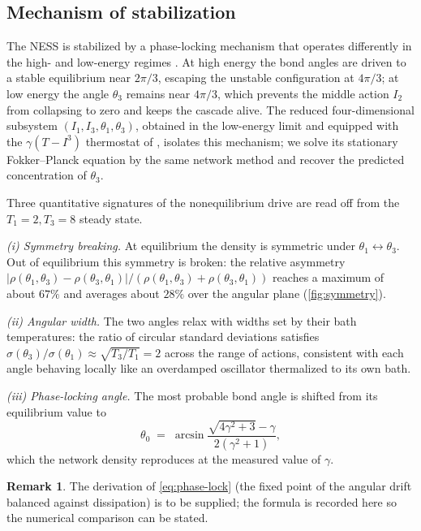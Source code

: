\documentclass[11pt,a4paper]{article}
\theoremstyle{definition}
\newtheorem{remark}[theorem]{Remark}
\numberwithin{equation}{section}   %
\begin{document}
\subsection{Mechanism of stabilization}\label{sec:stabilization}

The NESS is stabilized by a phase-locking mechanism that operates differently in
the high- and low-energy regimes \cite{HLNS}. At high energy the bond angles are
driven to a stable equilibrium near $2\pi/3$, escaping the unstable
configuration at $4\pi/3$; at low energy the angle $\theta_3$ remains near
$4\pi/3$, which prevents the middle action $I_2$ from collapsing to zero and
keeps the cascade alive. The reduced four-dimensional subsystem
$(I_1,I_3,\theta_1,\theta_3)$, obtained in the low-energy limit and equipped
with the $\gamma(T-I^3)$ thermostat of \cite{HLNS}, isolates this mechanism; we
solve its stationary Fokker--Planck equation by the same network method and
recover the predicted concentration of $\theta_3$.

Three quantitative signatures of the nonequilibrium drive are read off from the
$T_1=2,T_3=8$ steady state.

\emph{(i) Symmetry breaking.} At equilibrium the density is symmetric under
$\theta_1\leftrightarrow\theta_3$. Out of equilibrium this symmetry is broken:
the relative asymmetry $|\rho(\theta_1,\theta_3)-\rho(\theta_3,\theta_1)|/
(\rho(\theta_1,\theta_3)+\rho(\theta_3,\theta_1))$ reaches a maximum of about
$67\%$ and averages about $28\%$ over the angular plane (\cref{fig:symmetry}).

\emph{(ii) Angular width.} The two angles relax with widths set by their bath
temperatures: the ratio of circular standard deviations satisfies
$\sigma(\theta_3)/\sigma(\theta_1)\approx\sqrt{T_3/T_1}=2$ across the range of
actions, consistent with each angle behaving locally like an overdamped
oscillator thermalized to its own bath.

\emph{(iii) Phase-locking angle.} The most probable bond angle is shifted from
its equilibrium value to
\begin{equation}\label{eq:phase-lock}
  \theta_0 \;=\; \arcsin\!\frac{\sqrt{4\gamma^2+3}-\gamma}{2(\gamma^2+1)},
\end{equation}
which the network density reproduces at the measured value of $\gamma$.

\begin{remark}\label{rem:eq47}
The derivation of \eqref{eq:phase-lock} (the fixed point of the angular drift
balanced against dissipation) is to be supplied; the formula is recorded here so
the numerical comparison can be stated.
\end{remark}
\end{document}
